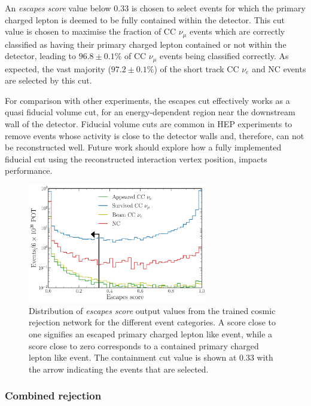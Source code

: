 An \emph{escapes score} value below $0.33$ is chosen to select events for which the primary
charged lepton is deemed to be fully contained within the detector. This cut value is chosen to
maximise the fraction of CC $\nu_{\mu}$ events which are correctly classified as having their
primary charged lepton contained or not within the detector, leading to $96.8\pm0.1\%$ of CC
$\nu_{\mu}$ events being classified correctly. As expected, the vast majority ($97.2\pm0.1\%$) of
the short track CC $\nu_{e}$ and NC events are selected by this cut.

For comparison with other experiments, the escapes cut effectively works as a quasi fiducial
volume cut, for an energy-dependent region near the downstream wall of the detector. Fiducial
volume cuts are common in HEP experiments to remove events whose activity is close to the detector
walls and, therefore, can not be reconstructed well. Future work should explore how a fully
implemented fiducial cut using the reconstructed interaction vertex position, impacts performance.

\begin{figure} %
    \includegraphics[width=0.7\textwidth]{diagrams/7-results/final_escapes_outputs.pdf}
    \caption[Distribution of escapes score output values]
    {Distribution of \emph{escapes score} output values from the trained cosmic rejection network
        for the different event categories. A score close to one signifies an escaped primary
        charged lepton like event, while a score close to zero corresponds to a contained primary
        charged lepton like event. The containment cut value is shown at 0.33 with the arrow
        indicating the events that are selected.}
    \label{fig:final_escapes_outputs}
\end{figure}

\subsubsection*{Combined rejection} %


